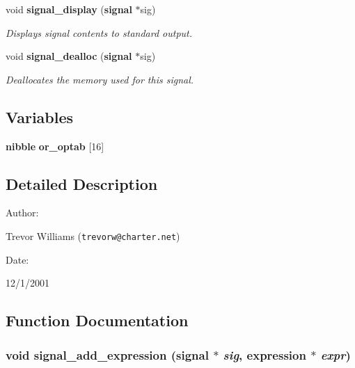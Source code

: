\begin{CompactItemize}
void {\bf signal\_\-display} ({\bf signal} $\ast$sig)
\begin{CompactList}\small\item\em Displays signal contents to standard output.\item\end{CompactList}\item 
void {\bf signal\_\-dealloc} ({\bf signal} $\ast$sig)
\begin{CompactList}\small\item\em Deallocates the memory used for this signal.\item\end{CompactList}\end{CompactItemize}
\subsection*{Variables}
\begin{CompactItemize}
\item 
{\bf nibble} {\bf or\_\-optab} [16]
\end{CompactItemize}


\subsection{Detailed Description}


\begin{Desc}
\item[Author: ]\par
Trevor Williams ({\tt trevorw@charter.net}) \end{Desc}
\begin{Desc}
\item[Date: ]\par
12/1/2001\end{Desc}


\subsection{Function Documentation}
\subsubsection{\setlength{\rightskip}{0pt plus 5cm}void signal\_\-add\_\-expression ({\bf signal} $\ast$ {\em sig}, {\bf expression} $\ast$ {\em expr})}\label{signal_8c_a7}


